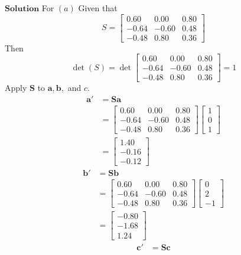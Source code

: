 \documentclass{article}
\begin{document}
\begin{flushleft}
$\boxed{\textbf{Solution}}$ For $(a)$ Given that
$$S=\begin{bmatrix}0.60 & 0.00 & 0.80 \\ -0.64 & -0.60 & 0.48 \\ -0.48 & 0.80 & 0.36\end{bmatrix}$$
Then
$$
\operatorname{det}(S)=\operatorname{det}\begin{bmatrix}
0.60 & 0.00 & 0.80 \\
-0.64 & -0.60 & 0.48 \\
-0.48 & 0.80 & 0.36
\end{bmatrix}=1
$$
Apply $\mathbf{S}$ to $\mathbf{a}, \mathbf{b},$ and $c$.
$$
\begin{aligned}
\mathbf{a}' &=\mathbf{S} \mathbf{a} \\
&=\begin{bmatrix}
0.60 & 0.00 & 0.80 \\
-0.64 & -0.60 & 0.48 \\
-0.48 & 0.80 & 0.36
\end{bmatrix}\begin{bmatrix}
1 \\
0 \\
1
\end{bmatrix} \\
&=\begin{bmatrix}
1.40 \\
-0.16 \\
-0.12
\end{bmatrix}
\end{aligned}
$$
$$
\begin{aligned}
\mathbf{b}' &=\mathbf{S} \mathbf{b} \\
&=\begin{bmatrix}
0.60 & 0.00 & 0.80 \\
-0.64 & -0.60 & 0.48 \\
-0.48 & 0.80 & 0.36
\end{bmatrix}\begin{bmatrix}
0 \\
2 \\
-1
\end{bmatrix} \\
&=\begin{bmatrix}
-0.80 \\
-1.68 \\
1.24
\end{bmatrix}
\end{aligned}
$$
$$
\begin{aligned}
\mathbf{c}' &=\mathbf{S} \mathbf{c} \\

\end{aligned}$$
\end{flushleft}
\end{document}

